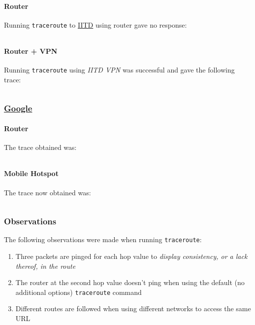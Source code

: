 \documentclass[11pt]{article}
\begin{document}
\paragraph{Router} Running \texttt{traceroute} to \href{https://www.iitd.ac.in}{IITD} using router gave no response:
\inputminted{text}{outputs/traceroute_iitd_novpn}

\paragraph{Router + VPN} Running \texttt{traceroute} using \textit{IITD VPN} was successful and gave the following trace:
\inputminted{text}{outputs/traceroute_iitd_vpn}

\subsubsection{\href{https://www.google.com}{Google}}

\paragraph{Router} The trace obtained was:
\inputminted{text}{outputs/traceroute_google_router}

\paragraph{Mobile Hotspot} The trace now obtained was:
\inputminted{text}{outputs/traceroute_google_hotspot}

\subsubsection{Observations}
The following observations were made when running \texttt{traceroute}:
\begin{enumerate}
    \item Three packets are pinged for each hop value to \textit{display consistency, or a lack thereof, in the route}
    \item The router at the second hop value doesn't ping when using the default (no additional options) \texttt{traceroute} command
    \item Different routes are followed when using different networks to access the same URL
\end{enumerate}
\end{document}
